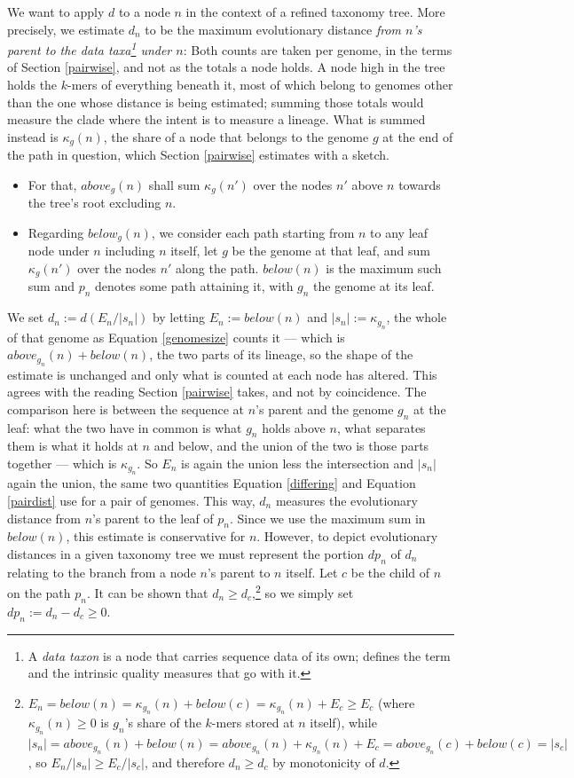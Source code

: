 \documentclass[pdflatex,sn-vancouver-num]{sn-jnl}
\begin{document}
We want to apply $d$ to a node $n$ in the context of a refined taxonomy tree. More precisely, we estimate $d_n$ to be the maximum evolutionary distance \emph{from $n$'s parent to the data taxa\footnote{A \emph{data taxon} is a node that carries sequence data of its own; \cite{genestrip-ft} defines the term and the intrinsic quality measures that go with it.} under $n$}:
Both counts are taken per genome, in the terms of Section \ref{pairwise}, and not as the totals a node
holds. A node high in the tree holds the $k$-mers of everything beneath it, most of which belong to
genomes other than the one whose distance is being estimated; summing those totals would measure the
clade where the intent is to measure a lineage. What is summed instead is $\kappa_g(n)$, the share of
a node that belongs to the genome $g$ at the end of the path in question, which
Section \ref{pairwise} estimates with a sketch.
\begin{itemize}
\item
For that, $above_g(n)$ shall sum $\kappa_g(n')$ over the nodes $n'$ above $n$ towards the tree's root excluding $n$.
\item
Regarding $below_g(n)$, we consider each path starting from $n$ to any leaf node under $n$ including $n$ itself, let $g$ be the genome at that leaf, and sum $\kappa_g(n')$ over the nodes $n'$ along the path. $below(n)$ is the maximum such sum and $p_n$ denotes some path attaining it, with $g_n$ the genome at its leaf.
\end{itemize}
We set $d_n := d(E_n/|s_n|)$ by letting $E_n := below(n)$ and $|s_n| := \kappa_{g_n}$, the whole of
that genome as Equation \eqref{genomesize} counts it --- which is $above_{g_n}(n) + below(n)$, the
two parts of its lineage, so the shape of the estimate is unchanged and only what is counted at each
node has altered. This agrees with the reading Section \ref{pairwise} takes, and not by coincidence.
The comparison here is between the sequence at $n$'s parent and the genome $g_n$ at the leaf: what
the two have in common is what $g_n$ holds above $n$, what separates them is what it holds at $n$ and
below, and the union of the two is those parts together --- which is $\kappa_{g_n}$. So $E_n$ is
again the union less the intersection and $|s_n|$ again the union, the same two quantities
Equation \eqref{differing} and Equation \eqref{pairdist} use for a pair of genomes.
This way, $d_n$ measures the evolutionary distance from $n$'s parent to the leaf of $p_n$. 
Since we use the maximum sum in $below(n)$, this estimate is conservative for $n$.
However, to depict evolutionary distances in a given taxonomy tree we must represent the portion $dp_n$ of $d_n$ relating to the branch from a node $n$'s parent to $n$ itself.
Let $c$ be the child of $n$ on the path $p_n$. It can be shown that $d_n \geq d_c$,\footnote{$E_n = below(n) = \kappa_{g_n}(n) + below(c) = \kappa_{g_n}(n) + E_c \geq E_c$ (where $\kappa_{g_n}(n) \geq 0$ is $g_n$'s share of the $k$-mers stored at $n$ itself), while $|s_n| = above_{g_n}(n) + below(n) = above_{g_n}(n) + \kappa_{g_n}(n) + E_c = above_{g_n}(c) + below(c) = |s_c|$, so $E_n/|s_n| \geq E_c/|s_c|$, and therefore $d_n \geq d_c$ by monotonicity of $d$.} so we simply set $dp_n := d_n - d_{c}\geq 0$.
\end{document}

